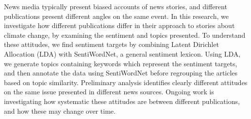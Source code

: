 News media typically present biased accounts of news stories, and different publications present different angles on the same event. In this research, we investigate how different publications differ in their approach to stories about climate change, by examining the sentiment and topics presented. To understand these attitudes, we find sentiment targets by combining Latent Dirichlet Allocation (LDA) with SentiWordNet, a general sentiment lexicon. Using LDA, we generate topics containing keywords which represent the sentiment targets, and then annotate the data using SentiWordNet before regrouping the articles based on topic similarity. Preliminary analysis identifies clearly different attitudes on the same issue presented in different news sources. Ongoing work is investigating how systematic these attitudes are between different publications, and how these may change over time.
